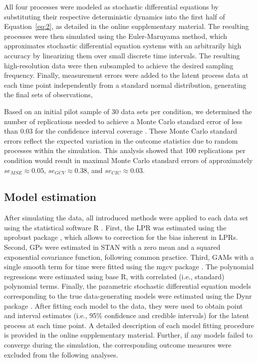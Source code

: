\documentclass[man, floatsintext]{apa7}
\begin{document}
All four processes were modeled as stochastic differential equations by
substituting their respective deterministic dynamics into the first half of
Equation~\ref{eq:2}, as detailed in the online supplementary material. The
resulting processes were then simulated using the Euler-Maruyama method, which
approximates stochastic differential equation systems with an arbitrarily high
accuracy by linearizing them over small discrete time intervals. The resulting
high-resolution data were then subsampled to achieve the desired sampling
frequency. Finally, measurement errors were added to the latent process data at
each time point independently from a standard normal distribution, generating
the final sets of observations,

Based on an initial pilot sample of 30 data sets per condition, we determined
the number of replications needed to achieve a Monte Carlo standard error of
less than 0.03 for the confidence interval coverage
\parencite{siepe_simulation_2023}. These Monte Carlo standard errors reflect
the expected variation in the outcome statistics due to random processes within
the simulation. This analysis showed that 100 replications per condition
would result in maximal Monte Carlo standard errors of approximately $se_{MSE}
  \approx 0.05$, $se_{GCV} \approx 0.38$, and $se_{CIC} \approx 0.03$.

\subsection{Model estimation}

After simulating the data, all introduced methods were applied to each data set
using the statistical software R \parencite{R-base}. First, the LPR was
estimated using the nprobust package \parencite{R-nprobust}, which allows to
correction for the bias inherent in LPRs. Second, GPs were estimated in STAN
\parencite{R-cmdstanr} with a zero mean and a squared exponential covariance
function, following common practice. Third, GAMs with a single smooth term for
time were fitted using the mgcv package \parencite{R-mgcv_a}. The polynomial
regressions were estimated using base R, with correlated (i.e., standard)
polynomial terms. Finally, the parametric stochastic differential equation
models corresponding to the true data-generating models were estimated using
the Dynr package \parencite{R-dynr}. After fitting each model to the data, they
were used to obtain point and interval estimates (i.e., 95\% confidence and
credible intervals) for the latent process at each time point. A detailed
description of each model fitting procedure is provided in the online
supplementary material. Further, if any models failed to converge during the
simulation, the corresponding outcome measures were excluded from the following
analyses.
\end{document}
